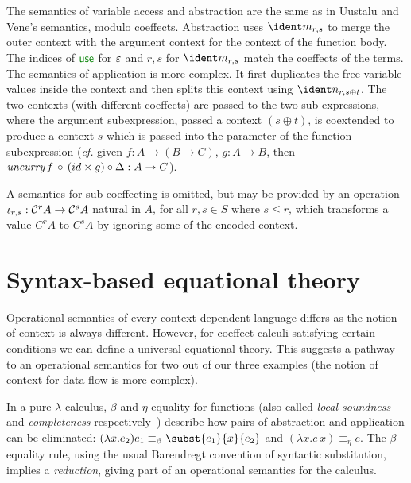 The semantics of variable access and abstraction are the same as in
Uustalu and Vene's semantics, modulo coeffects. Abstraction uses $\cmerge_{r, s}$ to merge the outer
context with the argument context for the context of the function body.
The indices of $\cunit$ for
$\varepsilon$ and $r,s$ for $\cmerge_{r, s}$ match the coeffects
of the terms.
The semantics of application is more complex. It first duplicates the
free-variable values inside the context and then splits this context
using $\csplit_{r, {s \oplus t}}$. The two contexts (with
different coeffects) are passed to the two sub-expressions,
where the argument subexpression, passed a context $(s \oplus t)$,
is coextended to produce a context $s$ which is passed into
the parameter of the function subexpression (\emph{cf.} given $f : A \rightarrow (B \rightarrow C)$,
 $g : A \rightarrow B$, then $\emph{uncurry} \, f \, \circ \, (id \times g) \circ \Delta : A \rightarrow C$).

A semantics for sub-coeffecting is omitted, but may be provided
by an operation 
$\iota_{r, s} : \mathcal{C}^r A \rightarrow \mathcal{C}^s A$ natural in $A$, for all $r, s \in S$ where $s \leq r$,
which transforms a value $C^r A$ to $C^s A$ by
ignoring some of the encoded context.


\section{Syntax-based equational theory}
\label{sec:syntactic}

Operational semantics of every context-dependent language differs as the notion of context 
is always different. However, for coeffect calculi satisfying certain conditions we can 
define a universal equational theory. This suggests a pathway to an operational semantics for 
two out of our three examples (the notion of context for data-flow is more complex).

In a pure $\lambda$-calculus, $\beta$ and $\eta$ equality for
functions (also called \emph{local soundness} and \emph{completeness}
respectively~\cite{logic-modal-reconstruction})
describe how pairs of abstraction and application can be eliminated:
$(\lambda x . e_2) e_1 \equiv_\beta \subst{e_1}{x}{e_2}$ and $(\lambda x . e \, x) 
\equiv_\eta e$. The $\beta$ equality rule, using the usual Barendregt convention of 
syntactic substitution, implies a \emph{reduction},
giving part of an operational semantics for the calculus.

